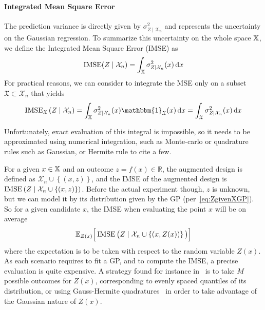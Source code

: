 \documentclass[../../Main_ManuscritThese.tex]{subfiles}
\begin{document}
\paragraph{Integrated Mean Square Error}
The prediction variance is directly given by
$\sigma^2_{Z\mid \mathcal{X}_n}$ and represents the uncertainty on the
Gaussian regression. To summarize this uncertainty on the whole space
$\mathbb{X}$, we define the Integrated Mean Square Error
(IMSE)\cite{sacks_designs_1989} as
\begin{equation}
  \operatorname{\mathrm{IMSE}}(Z \mid \mathcal{X}_n) = \int_{\mathbb{X}} \sigma_{Z\mid\mathcal{X}_n}^2(x)\,\mathrm{d}x
\end{equation}
For practical reasons, we can consider to integrate the MSE only on a
subset $\mathfrak{X}\subset \mathcal{X}_n$ that yields
\begin{equation}
  \IMSE_{\mathfrak{X}}\left(Z \mid \mathcal{X}_n \right) = \int_{\Xspace} \sigma^2_{Z\mid \mathcal{X}_n}(x)  \mathbbm{1}_{\mathfrak{X}}(x)\,\mathrm{d}x = \int_{\mathfrak{X}} \sigma^2_{Z\mid \mathcal{X}_n}(x)\,\mathrm{d}x
\end{equation}

Unfortunately, exact evaluation of this integral is impossible, so it
needs to be approximated using numerical integration, such as
Monte-carlo or quadrature rules such as Gaussian, or Hermite rule to
cite a few.%


For a given $x\in \mathbb{X}$ and an outcome $z=f(x)\in \mathbb{R}$, the
augmented design is defined as
$\mathcal{X}_n \cup \left\{(x, z)\right\}$, and the IMSE of the
augmented design is
$\operatorname{\mathrm{IMSE}}\left(Z \mid \mathcal{X}_n \cup \left\{(x, z)\right\} \right)$.
Before the actual experiment though, $z$ is unknown, but we can model
it by its distribution given by the GP (per~\cref{eq:ZgivenXGP}). So
for a given candidate $x$, the IMSE when evaluating the point $x$ will
be on average
\begin{equation}
  \label{eq:IMSE_augmented}
  \mathbb{E}_{Z(x)}\Big[\operatorname{\mathrm{IMSE}}\big(Z \mid \mathcal{X}_n \cup \left\{(x, Z(x))\right\} \big)\Big]
\end{equation}
where the expectation is to be taken with respect to the random
variable $Z(x)$. As each scenario requires to fit a GP, and to compute
the IMSE, a precise evaluation is quite expensive. A strategy found
for instance in~\cite{villemonteix_informational_2006} is to take $M$
possible outcomes for $Z(x)$, corresponding to evenly spaced quantiles
of its distribution, or using Gauss-Hermite
quadratures~\cite{bernard_methodes_2019} in order to take advantage of
the Gaussian nature of $Z(x)$.
\end{document}
